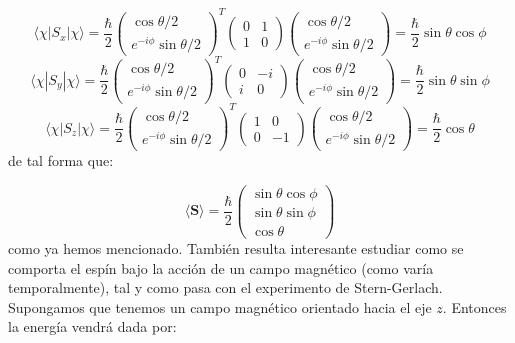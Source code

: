 \documentclass[12pt]{article}
\newcommand{\Sn}{\mathbf{S}}
\begin{document}
\begin{equation}
\langle \chi | S_x | \chi \rangle = \frac{\hbar}{2}
\begin{pmatrix}
\cos \theta/2 \\
 e^{-i\phi} \sin \theta/2
\end{pmatrix}^T \begin{pmatrix}
0 & 1 \\
1 & 0 
\end{pmatrix}
\begin{pmatrix}
\cos \theta/2 \\
 e^{-i\phi} \sin \theta/2
\end{pmatrix} = \frac{\hbar}{2}  \sin \theta \cos \phi
\end{equation}
\begin{equation}
\langle \chi | S_y | \chi \rangle = \frac{\hbar}{2}
\begin{pmatrix}
\cos \theta/2 \\
 e^{-i\phi} \sin \theta/2
\end{pmatrix}^T \begin{pmatrix}
0 & -i \\
i & 0 
\end{pmatrix}
\begin{pmatrix}
\cos \theta/2 \\
 e^{-i\phi} \sin \theta/2
\end{pmatrix} = \frac{\hbar}{2}  \sin \theta \sin \phi
\end{equation}
\begin{equation}
\langle \chi | S_z | \chi \rangle = \frac{\hbar}{2}
\begin{pmatrix}
\cos \theta/2 \\
 e^{-i\phi} \sin \theta/2
\end{pmatrix}^T \begin{pmatrix}
1 & 0 \\
0 & -1 
\end{pmatrix}
\begin{pmatrix}
\cos \theta/2 \\
 e^{-i\phi} \sin \theta/2
\end{pmatrix} = \frac{\hbar}{2}  \cos \theta 
\end{equation}
de tal forma que:

\begin{equation}
\langle \Sn \rangle = \dfrac{\hbar}{2} \begin{pmatrix}
\sin \theta \cos \phi \\
\sin \theta \sin \phi \\
\cos \theta
\end{pmatrix}
\end{equation}
como ya hemos mencionado. También resulta interesante estudiar como se comporta el espín bajo la acción de un campo magnético (como varía temporalmente), tal y como pasa con el experimento de Stern-Gerlach. Supongamos que tenemos un campo magnético orientado hacia el eje $z$. Entonces la energía vendrá dada por:
\end{document}

